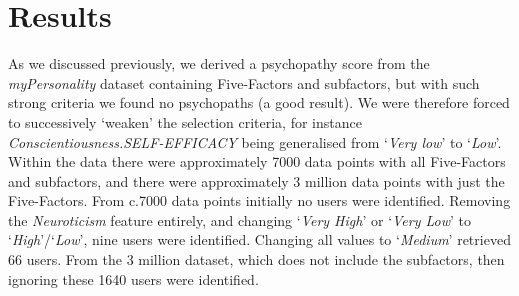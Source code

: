 \documentclass[conference]{IEEEtran}
\begin{document}
\section{Results}\label{res}

As we discussed previously, we derived a psychopathy score from the
{\emph{myPersonality}} dataset containing Five-Factors and subfactors,
but with such strong criteria we found no psychopaths (a good
result). We were therefore forced to successively `weaken' the
selection criteria, for instance
{\emph{Conscientiousness.SELF-EFFICACY}} being generalised from
`{\emph{Very low}}' to `{\emph{Low}}'. Within the data there were
approximately 7000 data points with all Five-Factors and subfactors,
and there were approximately 3 million data points with just the
Five-Factors. From c.7000 data points initially no users were
identified. Removing the {\emph{Neuroticism}} feature entirely, and
changing `{\emph{Very High}}' or `{\emph{Very Low}}' to
`{\emph{High}}'/`{\emph{Low}}', nine users were identified. Changing
all values to `{\emph{Medium}}' retrieved 66 users. From the 3 million
dataset, which does not include the subfactors, then ignoring these
1640 users were identified.
\end{document}
